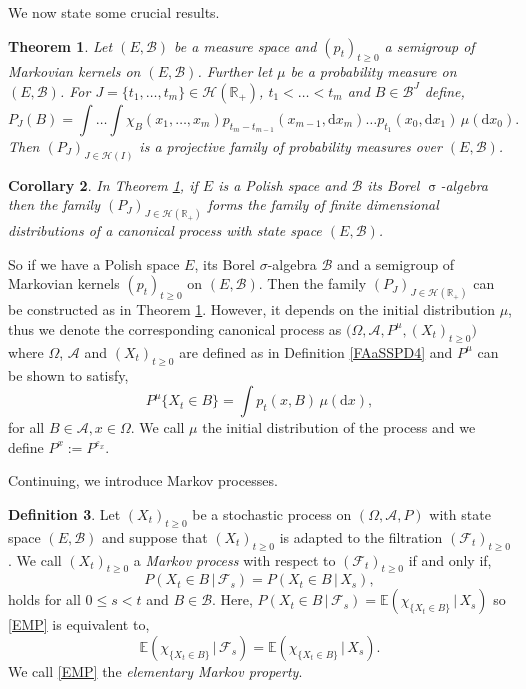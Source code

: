 \documentclass[a4paper, 12pt]{report}
\newtheorem{theorem}{Theorem}[section]
\newtheorem{cor}[theorem]{Corollary}
\theoremstyle{cor}
\theoremstyle{remark}
\theoremstyle{definition}
\newtheorem{defn}[theorem]{Definition}
\begin{document}
We now state some crucial results.

\begin{theorem}\label{FAaSSPT3}
Let $(E, \mathcal{B})$ be a measure space and $(p_t)_{t \ge 0}$ a semigroup of Markovian kernels on $(E, \mathcal{B})$.  Further let $\mu$ be a probability measure on $(E, \mathcal{B})$.  For $J = \{t_1, \dots, t_m\} \in \mathcal{H}(\mathbb{R}_+)$, $t_1 < \dots < t_m$ and $B \in \mathcal{B}^J$ define,
$$
P_J(B) = \int\dots\int\chi_B(x_1, \dots, x_m)p_{t_m - t_{m - 1}}(x_{m - 1}, \mathrm{d}x_m)\dots p_{t_1}(x_0, \mathrm{d}x_1)\,\mu(\mathrm{d}x_0).
$$
Then $(P_J)_{J \in \mathcal{H}(I)}$ is a projective family of probability measures over $(E, \mathcal{B})$.
\end{theorem}

\begin{cor}
In Theorem \ref{FAaSSPT3}, if $E$ is a Polish space and $\mathcal{B}$ its Borel $\upsigma$-algebra then the family $(P_J)_{J \in \mathcal{H}(\mathbb{R}_+)}$ forms the family of finite dimensional distributions of a canonical process with state space $(E, \mathcal{B})$.
\end{cor}
So if we have a Polish space $E$, its Borel $\sigma$-algebra $\mathcal{B}$ and a semigroup of Markovian kernels $(p_t)_{t \ge 0}$ on $(E, \mathcal{B})$.  Then the family $(P_J)_{J \in \mathcal{H}(\mathbb{R}_+)}$ can be constructed as in Theorem \ref{FAaSSPT3}.  However, it depends on the initial distribution $\mu$, thus we denote the corresponding canonical process as $\big(\Omega, \mathcal{A}, P^\mu, (X_t)_{t \ge 0}\big)$ where $\Omega$, $\mathcal{A}$ and $(X_t)_{t \ge 0}$ are defined as in Definition \ref{FAaSSPD4} and $P^\mu$ can be shown to satisfy,
$$
P^\mu\{X_t \in B\} = \int p_t(x, B)\,\mu(\mathrm{d}x),
$$
for all $B \in \mathcal{A}, x \in \Omega$.  We call $\mu$ the initial distribution of the process and we define $P^x := P^{\varepsilon_x}$.

Continuing, we introduce Markov processes.

\begin{defn}
Let $(X_t)_{t \ge 0}$ be a stochastic process on $(\Omega, \mathcal{A}, P)$ with state space $(E, \mathcal{B})$ and suppose that $(X_t)_{t \ge 0}$ is adapted to the filtration $(\mathcal{F}_t)_{t \ge 0}$.  We call $(X_t)_{t \ge 0}$ a \emph{Markov process} with respect to $(\mathcal{F}_t)_{t \ge 0}$ if and only if,
\begin{equation}\label{EMP}
P(X_t \in B\,|\,\mathcal{F}_s) = P(X_t \in B\,|\, X_s),
\end{equation}
holds for all $0 \le s < t$ and $B \in \mathcal{B}$.  Here, $P(X_t \in B\,|\, \mathcal{F}_s) = \mathbb{E}(\chi_{\{X_t \in B\}}\,|\, X_s)$ so \eqref{EMP} is equivalent to,
$$
\mathbb{E}(\chi_{\{X_t \in B\}}\,|\, \mathcal{F}_s) = \mathbb{E}(\chi_{\{X_t \in B\}}\,|\, X_s).
$$
We call \eqref{EMP} the \emph{elementary Markov property}.
\end{defn}
\end{document}
